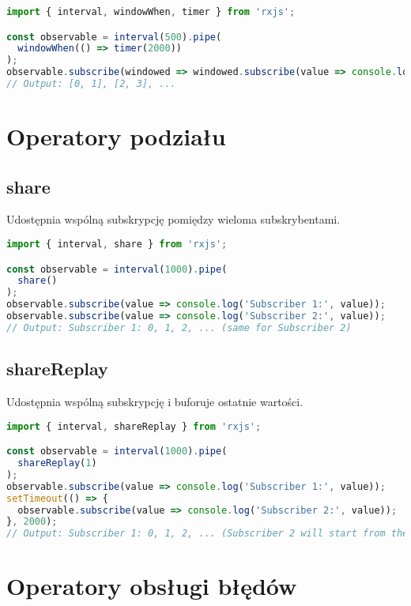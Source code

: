 \documentclass[a4paper,12pt]{article}
\begin{document}
\begin{lstlisting}[language=JavaScript, caption=Przykład użycia \texttt{windowWhen}]
import { interval, windowWhen, timer } from 'rxjs';

const observable = interval(500).pipe(
  windowWhen(() => timer(2000))
);
observable.subscribe(windowed => windowed.subscribe(value => console.log(value)));
// Output: [0, 1], [2, 3], ...
\end{lstlisting}

\section{Operatory podziału}
\subsection{share}
Udostępnia wspólną subskrypcję pomiędzy wieloma subskrybentami.

\begin{lstlisting}[language=JavaScript, caption=Przykład użycia \texttt{share}]
import { interval, share } from 'rxjs';

const observable = interval(1000).pipe(
  share()
);
observable.subscribe(value => console.log('Subscriber 1:', value));
observable.subscribe(value => console.log('Subscriber 2:', value));
// Output: Subscriber 1: 0, 1, 2, ... (same for Subscriber 2)
\end{lstlisting}

\subsection{shareReplay}
Udostępnia wspólną subskrypcję i buforuje ostatnie wartości.

\begin{lstlisting}[language=JavaScript, caption=Przykład użycia \texttt{shareReplay}]
import { interval, shareReplay } from 'rxjs';

const observable = interval(1000).pipe(
  shareReplay(1)
);
observable.subscribe(value => console.log('Subscriber 1:', value));
setTimeout(() => {
  observable.subscribe(value => console.log('Subscriber 2:', value));
}, 2000);
// Output: Subscriber 1: 0, 1, 2, ... (Subscriber 2 will start from the latest value)
\end{lstlisting}

\section{Operatory obsługi błędów}
\end{document}
